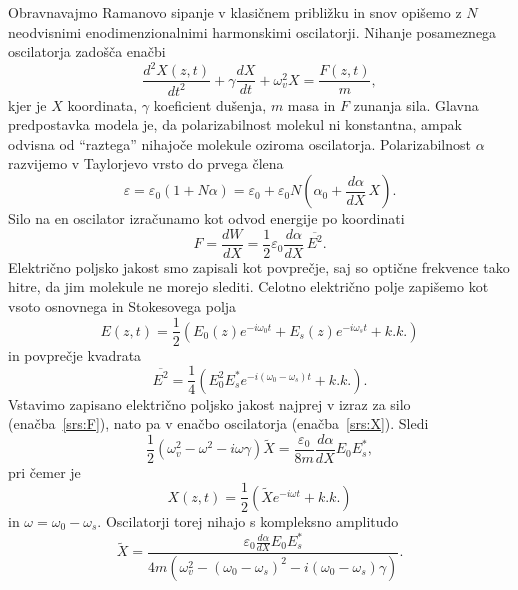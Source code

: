 Obravnavajmo Ramanovo sipanje v klasičnem približku in snov opišemo 
z $N$ neodvisnimi enodimenzionalnimi harmonskimi oscilatorji. Nihanje
posameznega oscilatorja zadošča enačbi
\begin{equation}
\frac{d^2X(z,t)}{dt^2}+ \gamma \frac{dX}{dt}+\omega_v^2X = \frac{F(z,t)}{m},
\label{srs:X}
\end{equation}
kjer je $X$ koordinata, $\gamma$ koeficient dušenja, $m$ masa in $F$ zunanja sila.
Glavna predpostavka modela je, da polarizabilnost molekul ni konstantna, ampak odvisna od 
``raztega'' nihajoče molekule oziroma oscilatorja. Polarizabilnost $\alpha$ 
razvijemo v Taylorjevo vrsto do prvega člena 
\begin{equation}
\varepsilon = \varepsilon_0(1+N\alpha) = \varepsilon_0+\varepsilon_0N\left(\alpha_0 + 
\frac{d\alpha}{dX}\,X\right).
\label{srs:a}
\end{equation}
Silo na en oscilator izračunamo kot odvod energije po koordinati 
\begin{equation}
F = \frac{dW}{dX}= \frac{1}{2}\varepsilon_0 \frac{d\alpha}{dX}\,\overline{E^2}.
\label{srs:F}
\end{equation}
Električno poljsko jakost smo zapisali kot povprečje, saj so optične frekvence 
tako hitre, da jim molekule ne morejo slediti. 
Celotno električno polje zapišemo kot vsoto osnovnega in Stokesovega polja
\begin{equation}
E(z,t)= \frac{1}{2}\left( E_0(z)e^{-i\omega_0t}+ E_s(z)e^{-i\omega_st} + k.k.\right)
\end{equation}
in povprečje kvadrata
\begin{equation}
\overline{E^2} = \frac{1}{4}\left(E_0^2E_s^* e^{-i(\omega_0-\omega_s)t}+k.k.\right).
\end{equation}
Vstavimo zapisano električno poljsko jakost najprej v izraz za silo (enačba~\ref{srs:F}),
nato pa v enačbo oscilatorja (enačba~\ref{srs:X}). Sledi
\begin{equation}
\frac{1}{2}\left(\omega_v^2-\omega^2-i\omega\gamma\right)\tilde{X} = 
\frac{\varepsilon_0}{8m}\frac{d\alpha}{dX}E_0 E_s^*,
\end{equation}
pri čemer je 
\begin{equation}
X(z,t) = \frac{1}{2}\left(\tilde{X}e^{-i\omega t}+ k.k.\right)
\end{equation}
in $\omega = \omega_0-\omega_s$. Oscilatorji torej nihajo s kompleksno amplitudo
\begin{equation}
\tilde{X} = \frac{\varepsilon_0\frac{d\alpha}{dX}E_0 E_s^*}{4m\left(
\omega_v^2-(\omega_0-\omega_s)^2-i(\omega_0-\omega_s)\gamma\right)}.
\end{equation}
